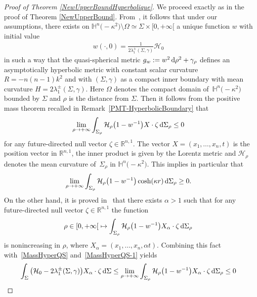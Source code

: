 \documentclass[pdftex]{sigma}
\numberwithin{equation}{section}
\begin{document}
\begin{proof}[Proof of Theorem \ref{NewUpperBoundHyperbolique}]
We proceed exactly as in the proof of Theorem \ref{NewUpperBound}. From~\cite{Kwong1,WangYau0}, it follows that under our assumptions, there exists on $\mathbb{H}^n\bigl(-\kappa^2\bigr)\setminus\Omega\simeq\Sigma\times[0,+\infty[{}$ a unique function $w$ with initial value
\begin{gather*}
w(\cdot,0)=\frac{1}{2\lambda^\pm_1(\Sigma,\gamma)}\mathcal{H}_0
\end{gather*}
in such a way that the quasi-spherical metric $g_w:=w^2\,{\rm d}\rho^2+\gamma_\rho$ defines an asymptotically hyperbolic metric with constant scalar curvature $R=-n(n-1)k^2$ and with $(\Sigma,\gamma)$ as a compact inner boundary with mean curvature  $H=2\lambda_1^\pm(\Sigma,\gamma)$. Here $\Omega$ denotes the compact domain of~$\mathbb{H}^n\bigl(-\kappa^2\bigr)$ bounded by $\Sigma$ and $\rho$ is the distance from $\Sigma$. Then it follows from the positive mass theorem recalled in Remark~\ref{PMT-HyperbolicBoundary} that
\begin{gather}\label{MassHyperQS}
\lim_{\rho\rightarrow+\infty}\int_{\Sigma_\rho}\mathcal{H}_{\rho}\big(1-w^{-1}\big) X\cdot\zeta\,{\rm d}\Sigma_\rho \leq 0
\end{gather}
for any future-directed null vector $\zeta\in\mathbb{R}^{n,1}$. The vector $X=(x_1,\dots,x_n,t)$ is the position vector in $\mathbb{R}^{n,1}$, the inner product is given by the Lorentz metric and $\mathcal{H}_\rho$ denotes the mean curvature of~$\Sigma_\rho$ in $\mathbb{H}^n\bigl(-\kappa^2\bigr)$. This implies in particular that
\begin{gather}\label{MassHyperQS-1}
\lim_{\rho\rightarrow+\infty}\int_{\Sigma_\rho}\mathcal{H}_{\rho}\big(1-w^{-1}\big) \cosh(\kappa r)\,{\rm d}\Sigma_\rho \geq 0.
\end{gather}
On the other hand, it is proved in~\cite{Kwong1,ShiTam2} that there exists $\alpha>1$ such that for any future-directed null vector $\zeta\in\mathbb{R}^{n,1}$ the function
\begin{gather*}%
\rho\in[0,+\infty[{}\mapsto \int_{\Sigma_\rho}\mathcal{H}_{\rho}\big(1-w^{-1}\big)X_\alpha\cdot\zeta\,{\rm d}\Sigma_\rho
\end{gather*}
is nonincreasing in $\rho$, where $X_\alpha=(x_1,\dots,x_n,\alpha t)$. Combining this fact with~\eqref{MassHyperQS} and~\eqref{MassHyperQS-1} yields
\begin{gather*}
\int_{\Sigma}\big(\mathcal{H}_{0}-2\lambda_1^\pm(\Sigma,\gamma)\big)X_\alpha\cdot\zeta\,{\rm d}\Sigma\leq\lim_{\rho\rightarrow+\infty}\int_{\Sigma_\rho}\mathcal{H}_{\rho}\big(1-w^{-1}\big) X_\alpha\cdot\zeta\,{\rm d}\Sigma_\rho \leq 0

\end{gather*}
\end{proof}
\end{document}

